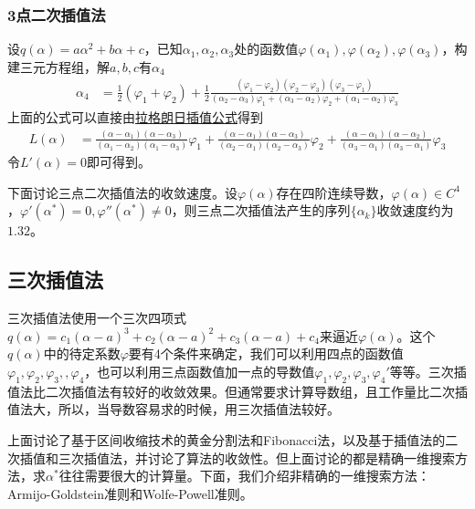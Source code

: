         \subsubsection{3点二次插值法}
            \par
            设$q(\alpha)=a{\alpha}^2+b{\alpha}+c$，已知${\alpha}_1,{\alpha}_2,\alpha_3$处的函数值$\varphi({\alpha}_1),\varphi({\alpha}_2),{\varphi}({\alpha}_3)$，构建三元方程组，解$a,b,c$有${\alpha}_4$
                    \begin{align*}
                    {\alpha}_4 &=\frac{1}{2}({\varphi}_1+{\varphi}_2)+\frac{1}{2}\frac {({\varphi}_1-{\varphi}_2)({\varphi}_2-{\varphi}_3)({\varphi}_3-{\varphi}_1)}{({\alpha}_2-{\alpha}_3){\varphi}_1+({\alpha}_3-{\alpha}_2){\varphi}_2+({\alpha}_1-{\alpha}_2){\varphi}_3}
                    \end{align*}
            上面的公式可以直接由\underline{拉格朗日插值公式}得到
                    \begin{align*}
                    L(\alpha) &=\frac{({\alpha}-{\alpha}_1)({\alpha}-{\alpha}_3)}{({\alpha}_1-{\alpha}_2)({\alpha}_1-{\alpha}_3)}{\varphi}_1+\frac {({\alpha}-{\alpha}_1)({\alpha}-{\alpha}_3)}{({\alpha}_2-{\alpha}_1)({\alpha}_2-{\alpha}_3)}{\varphi}_2 +\frac {({\alpha}-{\alpha}_1)({\alpha}-{\alpha}_2)}{({\alpha}_3-{\alpha}_1)({\alpha}_3-{\alpha}_1)}{\varphi}_3
                    \end{align*}
            令$L'(\alpha)=0$即可得到。
            \par
            下面讨论三点二次插值法的收敛速度。设$\varphi(\alpha)$存在四阶连续导数，$\varphi(\alpha) \in C^4$，${\varphi}'({\alpha}^*)=0,{\varphi}''({\alpha}^*) \ne 0$，则三点二次插值法产生的序列$\{{\alpha}_k\}$收敛速度约为$1.32$。\\
    \subsection{三次插值法}
        \par
        三次插值法使用一个三次四项式$q(\alpha)=c_1({\alpha}-a)^3+c_2({\alpha}-a)^2+c_3({\alpha}-a)+c_4$来逼近$\varphi(\alpha)$。这个$q(\alpha)$中的待定系数$\varphi$要有4个条件来确定，我们可以利用四点的函数值${\varphi}_1,{\varphi}_2,{\varphi}_3,,{\varphi}_4$，也可以利用三点函数值加一点的导数值${\varphi}_1,{\varphi}_2,{\varphi}_3,{\varphi}_4'$等等。三次插值法比二次插值法有较好的收敛效果。但通常要求计算导数组，且工作量比二次插值法大，所以，当导数容易求的时候，用三次插值法较好。
        \par
        上面讨论了基于区间收缩技术的黄金分割法和Fibonacci法，以及基于插值法的二次插值和三次插值法，并讨论了算法的收敛性。但上面讨论的都是精确一维搜索方法，求${\alpha}^*$往往需要很大的计算量。下面，我们介绍非精确的一维搜索方法：Armijo-Goldstein准则和Wolfe-Powell准则。
